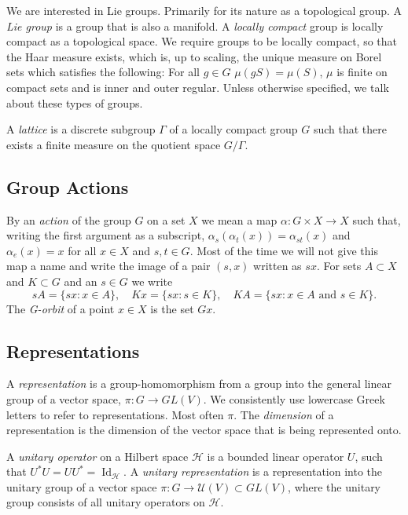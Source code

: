 \documentclass[
  12pt
]{article}
\theoremstyle{plain}
\newcommand{\hilb}{\ensuremath{\mathscr{H}}\xspace}
\DeclareMathOperator{\Id}{Id}
\begin{document}
  We are interested in Lie groups. Primarily for its nature as a topological group.
  A \emph{ Lie group } is a group that is also a manifold. A \emph{locally compact} group
  is locally compact as a topological space.
  We require groups to be locally compact, so that the Haar measure exists, which is, up to scaling,
  the unique measure on Borel sets which satisfies the following: For all $g\in G$
  $\mu(gS) = \mu(S)$, $\mu$ is finite on compact sets and is inner and outer
  regular.
  Unless otherwise specified, we talk about these types of groups.

  A \emph{lattice} is a discrete subgroup $\Gamma$ of a locally compact group $G$
  such that there exists a finite measure on the quotient space $G/\Gamma$.




  \hypertarget{group-actions}{
  \subsection{Group Actions}\label{group-actions}}

  By an \emph{action} of the group $G$ on a set $X$ we mean a
  map $\alpha: G \times X \rightarrow X$ such that, writing the first
  argument as a subscript, $\alpha_s(\alpha_t(x)) = \alpha_{st}(x)$ and
  $\alpha_e(x) = x$ for all $x \in X$ and $s, t \in G$.
  Most of the time we will not give this map a name and write the image of a pair
  $(s, x)$ written as $sx$. For sets $A \subset X$ and $K \subset G$
  and an $s \in G$ we write
  $$
  s A = \{sx : x \in A\},
  \quad
  K x = \{sx : s \in K \},
  \quad
  K A = \{sx : x \in A \text{ and } s \in K \}.
  $$
  The \emph{G-orbit} of a point $x \in X$ is the set $Gx$.

  \hypertarget{representations}{%
  \subsection{Representations}\label{representations}}


  A \emph{representation} is a group-homomorphism from a group into the general linear
  group of a vector space, $\pi: G \rightarrow GL(V)$.
  We consistently use lowercase Greek letters to refer to representations.
  Most often $\pi$.
  The \emph{dimension} of a representation is the dimension of the vector space
  that is being represented onto.


  A \emph{unitary operator} on a Hilbert space \hilb is a bounded linear
  operator $U$, such that $U^*U= UU^* = \Id_{\hilb}$. A \emph{unitary
  representation} is a representation into the unitary group of a vector space
  $\pi: G \rightarrow \mathcal{U}(V) \subset GL(V)$, where the unitary group
  consists of all unitary operators on \hilb.
\end{document}
